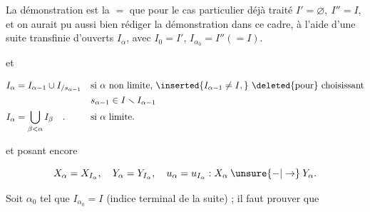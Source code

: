
La démonstration est  la $=$ que pour le cas particulier déjà traité $I'=\varnothing,\ I''=I$, et on aurait pu aussi bien rédiger la démonstration dans ce cadre, à l’aide d’une suite  transfinie d’ouverts  $I_\alpha$, avec $\boxed{I_0=I'}$, $I_{\alpha_0}=I''(=I)$.


et

\[
\begin{aligned}
 I_\alpha&=I_{\alpha-1}\cup I_{/s_{\alpha-1}}
 &&\text{si }\alpha\text{ non limite, }\inserted{I_{\alpha-1}\ne I,}\ \deleted{\text{pour}}\ \text{choisissant}\\
 &&&s_{\alpha-1}\in I\smallsetminus I_{\alpha-1}\\
 I_\alpha&=\bigcup_{\beta<\alpha} I_\beta\quad .
 &&\text{si }\alpha\text{ limite.}
\end{aligned}
\]

et posant encore

\[
 X_\alpha=X_{I_\alpha},\quad Y_\alpha=Y_{I_\alpha},\quad u_\alpha=u_{I_\alpha}:X_\alpha\mathbin{\unsure{-|\to}}Y_\alpha.
\]

Soit $\alpha_0$ tel que \deleted{$\unsure{\alpha}$} $I_{\alpha_0}=I$ (indice terminal de la suite) ;  il faut prouver que 


